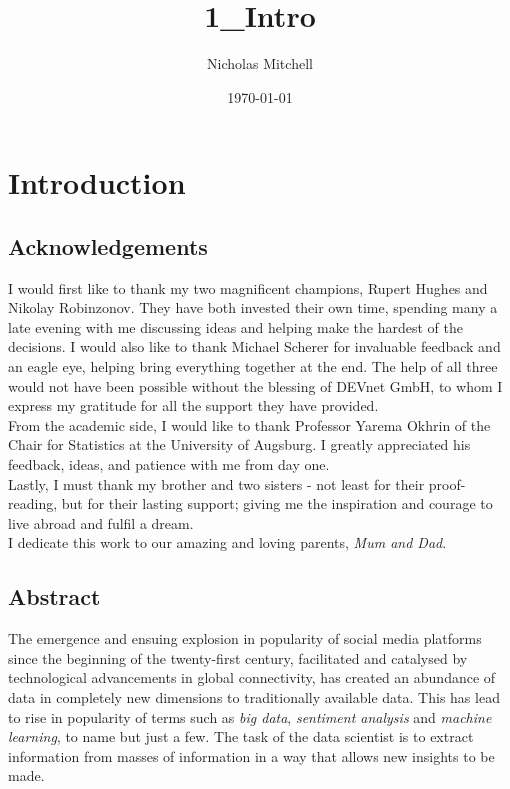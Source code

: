 \documentclass{article}
\author{Nicholas Mitchell}
\date{\today}
\title{1\_Intro}
\begin{document}
\maketitle
\tableofcontents

\pagebreak

\section{Introduction}
\label{sec-1}

\subsection{Acknowledgements}
\label{sec-1-1}

I would first like to thank my two magnificent champions, Rupert Hughes and Nikolay Robinzonov. They have both invested their own time, spending many a late evening with me discussing ideas and helping make the hardest of the decisions. I would also like to thank Michael Scherer for invaluable feedback and an eagle eye, helping bring everything together at the end. The help of all three would not have been possible without the blessing of DEVnet GmbH, to whom I express my gratitude for all the support they have provided.\\

\noindent
From the academic side, I would like to thank Professor Yarema Okhrin of the Chair for Statistics at the University of Augsburg. I greatly appreciated his feedback, ideas, and patience with me from day one.\\

\noindent
Lastly, I must thank my brother and two sisters - not least for their proof-reading, but for their lasting support; giving me the inspiration and courage to live abroad and fulfil a dream. \\ I dedicate this work to our amazing and loving parents, \emph{Mum and Dad}.


\pagebreak


\subsection{Abstract}
\label{sec-1-2}

The emergence and ensuing explosion in popularity of social media platforms since the beginning of the twenty-first century, facilitated and catalysed by technological advancements in global connectivity, has created an abundance of data in completely new dimensions to traditionally available data. This has lead to rise in popularity of terms such as \emph{big data}, \emph{sentiment analysis} and \emph{machine learning}, to name but just a few. The task of the data scientist is to extract information from masses of information in a way that allows new insights to be made.
\end{document}
